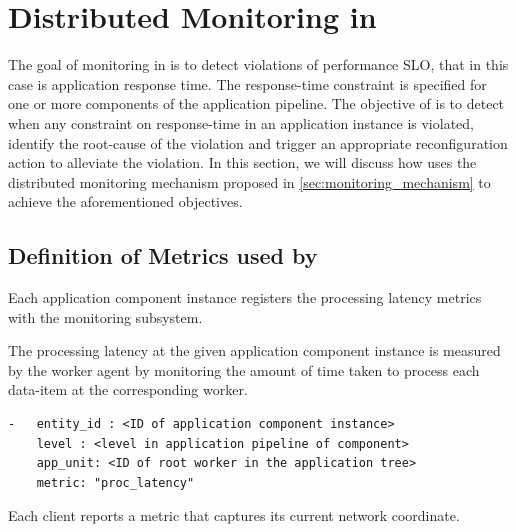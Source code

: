 \section{Distributed Monitoring in \oneedge{}}
\label{sec:oneedge_dist_mon}
The goal of monitoring in \oneedge{} is to detect violations of performance SLO, that in this case is application response time. The response-time constraint is specified for one or more components of the application pipeline. The objective of \oneedge{} is to detect when any constraint on response-time in an application instance is violated, identify the root-cause of the violation and trigger an appropriate reconfiguration action to alleviate the violation. In this section, we will discuss how \oneedge{} uses the distributed monitoring mechanism proposed in \cref{sec:monitoring_mechanism} to achieve the aforementioned objectives.

\subsection{Definition of Metrics used by \oneedge{}}
Each application component instance registers the processing latency metrics with the monitoring subsystem. 

The processing latency at the given application component instance is measured by the worker agent by monitoring the amount of time taken to process each data-item at the corresponding worker.

\begin{verbatim}
-   entity_id : <ID of application component instance>
    level : <level in application pipeline of component>
    app_unit: <ID of root worker in the application tree>
    metric: "proc_latency"
\end{verbatim}
\par \noindent Each client reports a metric that captures its current network coordinate.

